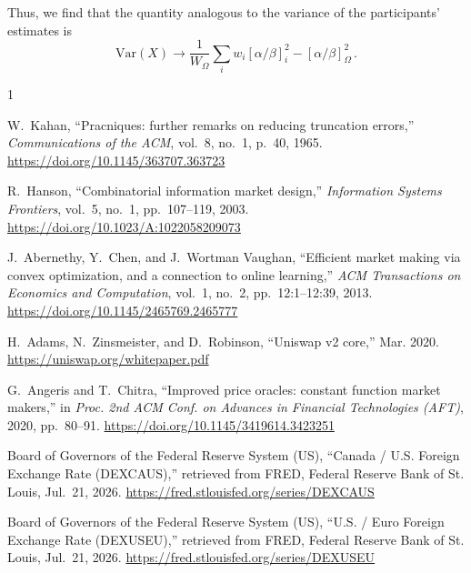 \documentclass[letterpaper]{article}
\newcommand{\priceAB}{\left[\alpha / \beta\right]}
\begin{document}
Thus, we find that the quantity analogous to the variance of the participants' estimates is
\begin{equation*}
    \mathrm{Var}(X) \rightarrow \frac{1}{W_\Omega} \sum_i w_i \priceAB_i^2 - \priceAB_\Omega^2  \, .
\end{equation*}

\begin{thebibliography}{1}

W.~Kahan, ``Pracniques: further remarks on reducing truncation errors,'' \emph{Communications of the ACM}, vol.~8, no.~1, p.~40, 1965. \url{https://doi.org/10.1145/363707.363723}

R.~Hanson, ``Combinatorial information market design,'' \emph{Information Systems Frontiers}, vol.~5, no.~1, pp.~107--119, 2003. \url{https://doi.org/10.1023/A:1022058209073}

J.~Abernethy, Y.~Chen, and J.~Wortman Vaughan, ``Efficient market making via convex optimization, and a connection to online learning,'' \emph{ACM Transactions on Economics and Computation}, vol.~1, no.~2, pp.~12:1--12:39, 2013. \url{https://doi.org/10.1145/2465769.2465777}

H.~Adams, N.~Zinsmeister, and D.~Robinson, ``Uniswap v2 core,'' Mar. 2020. \url{https://uniswap.org/whitepaper.pdf}

G.~Angeris and T.~Chitra, ``Improved price oracles: constant function market makers,'' in \emph{Proc. 2nd ACM Conf. on Advances in Financial Technologies (AFT)}, 2020, pp.~80--91. \url{https://doi.org/10.1145/3419614.3423251}

Board of Governors of the Federal Reserve System (US), ``Canada / U.S. Foreign Exchange Rate (DEXCAUS),'' retrieved from FRED, Federal Reserve Bank of St. Louis, Jul.~21, 2026. \url{https://fred.stlouisfed.org/series/DEXCAUS}

Board of Governors of the Federal Reserve System (US), ``U.S. / Euro Foreign Exchange Rate (DEXUSEU),'' retrieved from FRED, Federal Reserve Bank of St. Louis, Jul.~21, 2026. \url{https://fred.stlouisfed.org/series/DEXUSEU}

\end{thebibliography}
\end{document}
